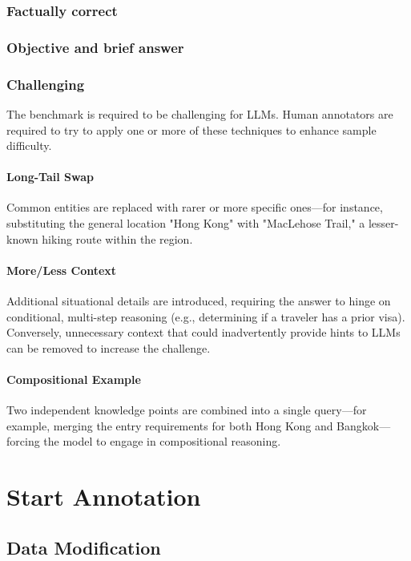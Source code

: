 \documentclass[11pt]{article}
\begin{document}
\subsubsection{Factually correct}

\subsubsection{Objective and brief answer}

\subsubsection{Challenging}

The benchmark is required to be challenging for LLMs. Human annotators are required to try to apply one or more of these techniques to enhance sample difficulty.

\paragraph{Long-Tail Swap}
Common entities are replaced with rarer or more specific ones—for instance, substituting the general location "Hong Kong" with "MacLehose Trail," a lesser-known hiking route within the region.

\paragraph{More/Less Context}
Additional situational details are introduced, requiring the answer to hinge on conditional, multi-step reasoning (e.g., determining if a traveler has a prior visa). Conversely, unnecessary context that could inadvertently provide hints to LLMs can be removed to increase the challenge.

\paragraph{Compositional Example}
Two independent knowledge points are combined into a single query—for example, merging the entry requirements for both Hong Kong and Bangkok—forcing the model to engage in compositional reasoning.

\section{Start Annotation}

\subsection{Data Modification}
\end{document}
